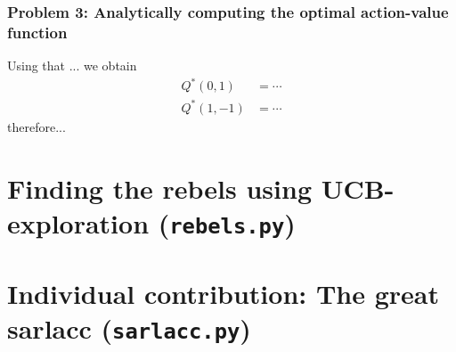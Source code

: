 \documentclass[12pt,twoside]{article}
\begin{document}
\subsubsection*{{\color{red}Problem 3:  Analytically computing the optimal action-value function}}
	
		Using that ... we obtain 
		\begin{align}
			Q^*(0,1) & = \cdots \\
			Q^*(1,-1) & = \cdots
		\end{align}
		therefore...
	
\section{Finding the rebels using UCB-exploration (\texttt{rebels.py})} 
\section{Individual contribution: The great sarlacc (\texttt{sarlacc.py})} 
\end{document}
